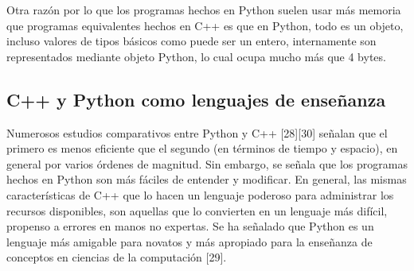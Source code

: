 Otra razón por lo que los programas hechos en Python suelen usar más memoria
que programas equivalentes hechos en C++ es que en Python, todo es un objeto,
incluso valores de tipos básicos como puede ser un entero, internamente son
representados mediante objeto Python, lo cual ocupa mucho más que 4 bytes.

\subsection{C++ y Python como lenguajes de enseñanza}

Numerosos estudios comparativos entre Python y C++ [28][30]  señalan que el
primero es menos eficiente que el segundo (en términos de tiempo y espacio), en
general por varios órdenes de magnitud. Sin embargo, se señala que los
programas hechos en Python son más fáciles de entender y modificar. En general,
las mismas características de C++ que lo hacen un lenguaje poderoso para
administrar los recursos disponibles, son aquellas que lo convierten en un
lenguaje más difícil, propenso a errores en manos no expertas. Se ha señalado
que Python es un lenguaje más amigable para novatos y más apropiado para la
enseñanza de conceptos en ciencias de la computación [29].
